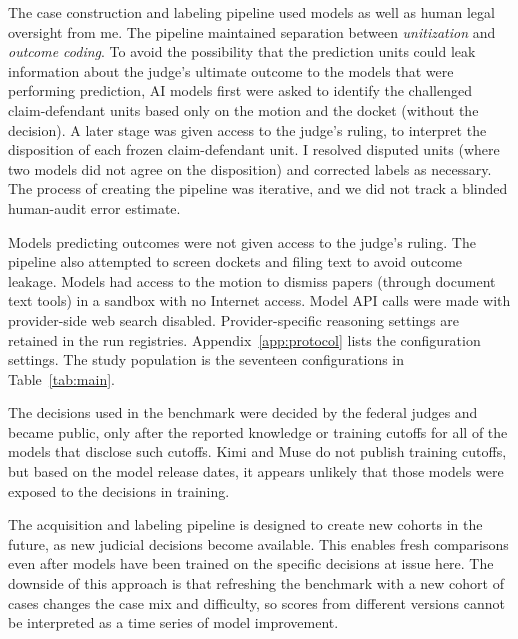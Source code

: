 \documentclass[11pt]{article}
\begin{document}
The case construction and labeling pipeline used models as well as human legal oversight from me. The pipeline maintained separation between \emph{unitization} and \emph{outcome coding}. To avoid the possibility that the prediction units could leak information about the judge's ultimate outcome to the models that were performing prediction, AI models first were asked to identify the challenged claim-defendant units based only on the motion and the docket (without the decision). A later stage was given access to the judge's ruling, to interpret the disposition of each frozen claim-defendant unit. I resolved disputed units (where two models did not agree on the disposition) and corrected labels as necessary. The process of creating the pipeline was iterative, and we did not track a blinded human-audit error estimate.

Models predicting outcomes were not given access to the judge's ruling. The pipeline also attempted to screen dockets and filing text to avoid outcome leakage. Models had access to the motion to dismiss papers (through document text tools) in a sandbox with no Internet access. Model API calls were made with provider-side web search disabled. Provider-specific reasoning settings are retained in the run registries. Appendix~\ref{app:protocol} lists the configuration settings. The study population is the seventeen configurations in Table~\ref{tab:main}.

The decisions used in the benchmark were decided by the federal judges and became public, only after the reported knowledge or training cutoffs for all of the models that disclose such cutoffs. Kimi and Muse do not publish training cutoffs, but based on the model release dates, it appears unlikely that those models were exposed to the decisions in training.

The acquisition and labeling pipeline is designed to create new cohorts in the future, as new judicial decisions become available. This enables fresh comparisons even after models have been trained on the specific decisions at issue here. The downside of this approach is that refreshing the benchmark with a new cohort of cases changes the case mix and difficulty, so scores from different versions cannot be interpreted as a time series of model improvement.
\end{document}
